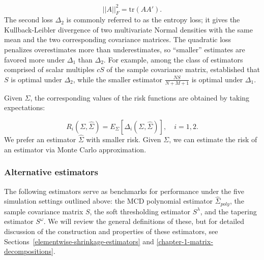 \[
\vert \vert A \vert \vert_F^2 = \mbox{tr}\left(A A'\right).
\]
\noindent
The second loss $\Delta_2$ is commonly referred to as the entropy loss; it gives the Kullback-Leibler divergence of two multivariate Normal densities with the same mean and the two corresponding covariance matrices. The quadratic loss penalizes overestimates more than underestimates, so ``smaller'' estimates are favored more under $\Delta_1$ than $\Delta_2$. For example, among the class of estimators comprised of scalar multiples $cS$ of the sample covariance matrix, \cite{haff1980empirical} established that $S$ is optimal under $\Delta_2$, while the smaller estimator $\frac{NS}{N+M+1}$ is optimal under $\Delta_1$. 

\bigskip

Given $\Sigma$, the corresponding values of the risk functions are obtained by taking expectations:

\begin{equation*}
R_i \left(\Sigma,\hat{\Sigma}\right) = E_\Sigma\left[\Delta_i\left(\Sigma,\hat{\Sigma}\right)\right], \quad i = 1,2.
\end{equation*}
\noindent
We prefer an estimator $\hat{\Sigma}$ with smaller risk.  Given $\Sigma$, we can estimate the risk of an estimator via Monte Carlo approximation. 


\subsubsection{Alternative estimators}
%
The following estimators serve as benchmarks for performance under the five simulation settings outlined above: the MCD polynomial estimator $\hat{\Sigma}_{poly}$, the sample covariance matrix $S$, the soft thresholding estimator $S^\lambda$, and the tapering estimator $S^\omega$. We will review the general definitions of these, but for detailed discussion of the construction and properties of these estimators, see Sections~\ref{elementwise-shrinkage-estimators} and \ref{chapter-1-matrix-decompositions}.

